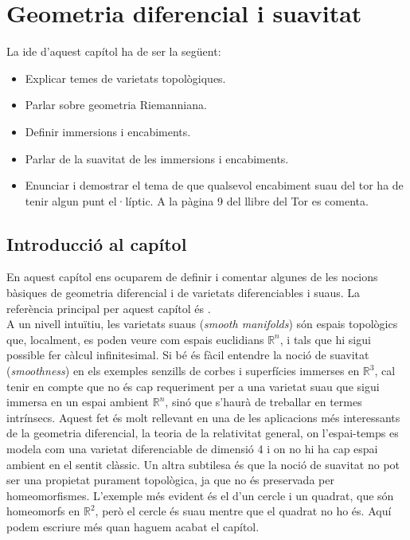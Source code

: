 \chapter{Geometria diferencial i suavitat}


{\color{blue} La ide d'aquest capítol ha de ser la següent:
\begin{itemize}
    \item Explicar temes de varietats topològiques.
    \item Parlar sobre geometria Riemanniana.
    \item Definir immersions i encabiments.
    \item Parlar de la suavitat de les immersions i encabiments.
    \item Enunciar i demostrar el tema de que qualsevol encabiment suau del tor ha de tenir algun punt el·líptic. A la pàgina 9 del llibre del Tor es comenta.

\end{itemize}


}

\section{Introducció al capítol}
En aquest capítol ens ocuparem de definir i comentar algunes de les nocions bàsiques de geometria diferencial i de varietats diferenciables i suaus. La referència principal per aquest capítol és \cite{lee2013}.\\
A un nivell intuïtiu, les varietats suaus (\textit{smooth manifolds}) són espais topològics que, localment, es poden veure com espais euclidians $\mathbb R^n$, i tals que hi sigui possible fer càlcul infinitesimal. Si bé és fàcil entendre la noció de suavitat (\textit{smoothness}) en els exemples senzills de corbes i superfícies immerses en $\mathbb R^3$, cal tenir en compte que no és cap requeriment per a una varietat suau que sigui immersa en un espai ambient $\mathbb R^n$, sinó que s'haurà de treballar en termes intrínsecs. Aquest fet és molt rellevant en una de les aplicacions més interessants de la geometria diferencial, la teoria de la relativitat general, on l'espai-temps es modela com una varietat diferenciable de dimensió 4 i on no hi ha cap espai ambient en el sentit clàssic. Un altra subtilesa és que la noció de suavitat no pot ser una propietat purament topològica, ja que no és preservada per homeomorfismes. L'exemple més evident és el d'un cercle i un quadrat, que són homeomorfs en $\mathbb R^2$, però el cercle és suau mentre que el quadrat no ho és.
{\color{blue} Aquí podem escriure més quan haguem acabat el capítol.}

